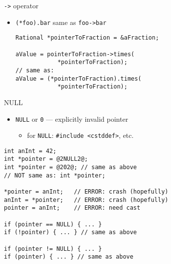 

\begin{frame}[fragile,label=arrowOp]{\texttt{-\textgreater} operator}
    \begin{itemize}
        \item \lstinline|(*foo).bar| same as \lstinline|foo->bar|
\begin{lstlisting}
Rational *pointerToFraction = &aFraction; 

aValue = pointerToFraction->times(
            *pointerToFraction);
// same as:
aValue = (*pointerToFraction).times(
            *pointerToFraction);
\end{lstlisting}
    \end{itemize}
\end{frame}


\begin{frame}[fragile,label=NULL]{NULL}
\begin{itemize}
\item \verb|NULL| or \verb|0| --- explicitly invalid pointer
    \begin{itemize}
    \item for {\tt NULL}: \lstinline|#include <cstddef>|, etc.
    \end{itemize}
\end{itemize}
\begin{lstlisting}
int anInt = 42;
int *pointer = @2NULL2@;
int *pointer = @202@; // same as above
// NOT same as: int *pointer;

*pointer = anInt;   // ERROR: crash (hopefully)
anInt = *pointer;   // ERROR: crash (hopefully)
pointer = anInt;    // ERROR: need cast

if (pointer == NULL) { ... }
if (!pointer) { ... } // same as above

if (pointer != NULL) { ... }
if (pointer) { ... } // same as above
\end{lstlisting}
\end{frame}

